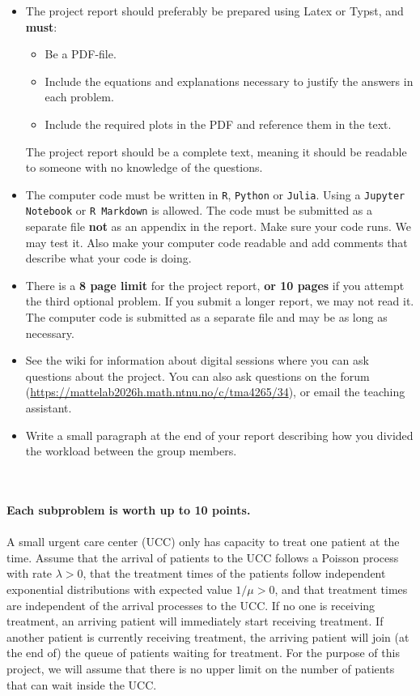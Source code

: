 \documentclass[1p]{article}		%
\begin{document}
\begin{itemize}
  \item
    The project report should preferably be prepared using Latex or Typst, and \textbf{must}:
    \begin{itemize} 
      \item
        Be a PDF-file.
      \item
        Include the equations and explanations necessary to justify the answers in each problem.
      \item 
        Include the required plots in the PDF and reference them in the text.
    \end{itemize}
    The project report should be a complete text, meaning it should be readable to someone with no knowledge of the questions. 
  \item
    The computer code must be written in \texttt{R}, \texttt{Python} or \texttt{Julia}. Using a \texttt{Jupyter Notebook} or \texttt{R Markdown} is allowed. The code must be submitted as a separate file \textbf{not} as an appendix in the report. Make sure your code runs. We may test it. Also make your computer code readable and add comments that describe what your code is doing.
  \item
    There is a \textbf{8 page limit} for the project report, \textbf{or 10 pages} if you attempt the third optional problem. If you submit a longer report,
    we may not read it. The computer code is submitted as a separate file and may be as long as necessary.
  \item
    See the wiki for information about digital sessions where you can ask questions about the project. You can also ask questions on the forum (\url{https://mattelab2026h.math.ntnu.no/c/tma4265/34}), or email the teaching assistant.
  \item
    Write a small paragraph at the end of your report describing how you divided the workload between the group members.
\end{itemize}
\newpage
\vspace{1cm}
\\\\
\textbf{Each subproblem is worth up to 10 points.} \\\\
A small urgent care center (UCC) only has capacity to treat one patient at the time.
Assume that the arrival of patients to the UCC follows a Poisson process with
rate $\lambda > 0$, that the treatment times of the patients follow independent 
exponential distributions with expected value $1/\mu > 0$, and that treatment times
are independent of the arrival processes to the UCC. If no one is receiving treatment, 
an arriving patient
will immediately start receiving treatment. If another patient is
currently receiving treatment, the arriving patient will join (at the end of) the queue of 
patients waiting for treatment. For the purpose of this project, we will assume that
there is no upper limit on the number of patients that can wait inside the UCC.
\end{document}
